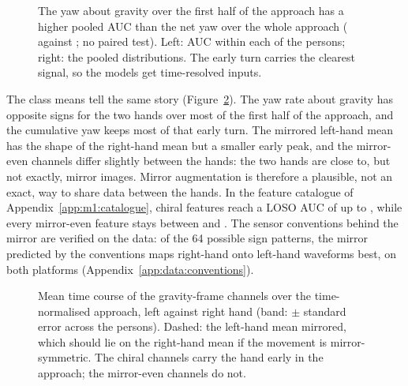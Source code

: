 \begin{figure}[htbp]
\centering
{}
\caption{The yaw about gravity over the first half of the approach has a higher pooled AUC than the net yaw over
the whole approach ( against ; no paired test). Left:
AUC within each of the  persons; right: the pooled distributions. The early turn carries the
clearest signal, so the models get time-resolved inputs.}
\label{fig:S2_13_first_half_yaw}
\end{figure}

The class means tell the same story (Figure~\ref{fig:S2_11_class_means}). The yaw rate about gravity has opposite
signs for the two hands over most of the first half of the approach, and the cumulative yaw keeps most of that
early turn. The mirrored left-hand mean has the shape of the right-hand mean but a smaller early peak, and the
mirror-even channels differ slightly between the hands: the two hands are close to, but not exactly, mirror images.
Mirror augmentation is therefore a plausible, not an exact, way to share data between the hands. In the feature catalogue of Appendix~\ref{app:m1:catalogue}, chiral features
reach a LOSO AUC of up to , while every mirror-even feature stays between
 and . The sensor conventions behind the mirror are verified on the
data: of the 64 possible sign patterns, the mirror predicted by the conventions maps right-hand onto left-hand
waveforms best, on both platforms (Appendix~\ref{app:data:conventions}).

\begin{figure}[htbp]
\centering
{}
\caption{Mean time course of the gravity-frame channels over the time-normalised approach, left against right
hand (band: $\pm$ standard error across the  persons). Dashed: the left-hand mean mirrored,
which should lie on the right-hand mean if the movement is mirror-symmetric. The chiral channels carry the hand
early in the approach; the mirror-even channels do not.}
\label{fig:S2_11_class_means}
\end{figure}

